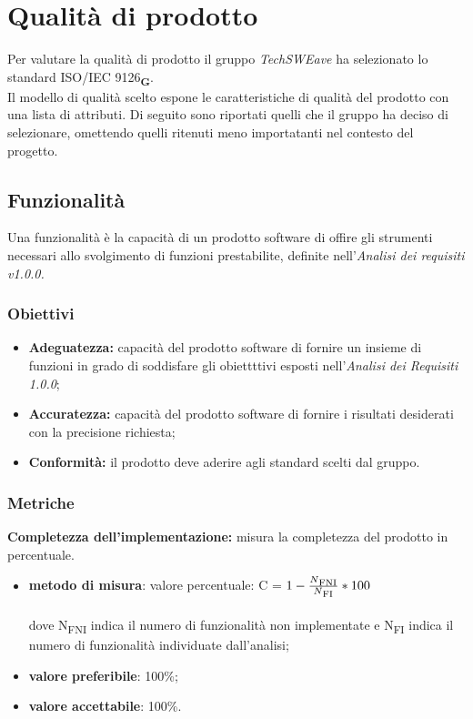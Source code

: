 \section{Qualità di prodotto}
Per valutare la qualità di prodotto il gruppo  \textit{TechSWEave} ha selezionato lo standard ISO/IEC 9126\textsubscript{\textbf{G}}.\\
Il modello di qualità scelto espone le caratteristiche di qualità del prodotto con una lista di attributi. Di seguito sono riportati quelli che il 
gruppo ha deciso di selezionare, omettendo quelli ritenuti meno importatanti nel contesto del progetto.
\subsection{Funzionalità}
Una funzionalità è la capacità di un prodotto software di offire gli strumenti necessari allo svolgimento di funzioni prestabilite, definite 
nell'\textit{Analisi dei requisiti v1.0.0.}
\subsubsection{Obiettivi}
\begin{itemize}
    \item \textbf{Adeguatezza:} capacità del prodotto software di fornire un insieme di funzioni in grado
    di soddisfare gli obiettttivi esposti nell’\textit{Analisi dei Requisiti 1.0.0};
    \item \textbf{Accuratezza:} capacità del prodotto software di fornire i risultati desiderati con la precisione richiesta;
    \item \textbf{Conformità:} il prodotto deve aderire agli standard scelti dal gruppo.
\end{itemize}
\subsubsection{Metriche}
\textbf{Completezza dell'implementazione:} misura la completezza del prodotto in percentuale.
\begin{itemize}
    \item \textbf{metodo di misura}: valore percentuale: C = $1-\frac{N\textsubscript{FNI}}{N\textsubscript{FI}}*100$ \\
    \\dove N\textsubscript{FNI} indica il numero di funzionalità non implementate e N\textsubscript{FI} indica il numero di funzionalità 
    individuate dall'analisi;
    \item \textbf{valore preferibile}: 100\%;
    \item \textbf{valore accettabile}: 100\%.
\end{itemize}
